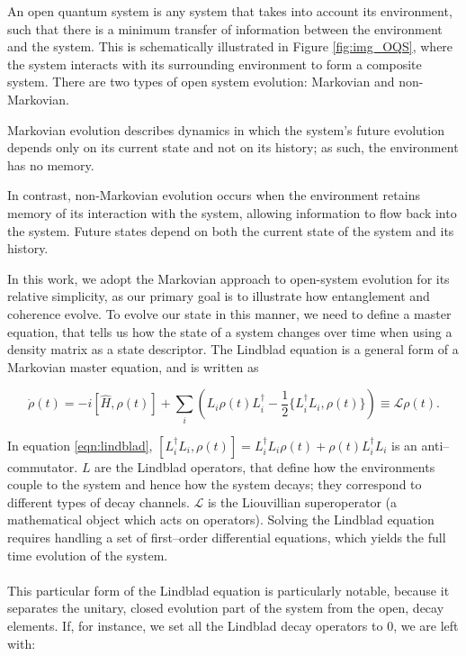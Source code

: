 \documentclass[11pt]{article}
\begin{document}
\noindent An open quantum system is any system that takes into account its environment, such that there is a minimum transfer of information between the environment and the system. This is schematically illustrated in Figure \ref{fig:img_OQS}, where the system interacts with its surrounding environment to form a composite system. There are two types of open system evolution: Markovian and non-Markovian.

Markovian evolution describes dynamics in which the system's future evolution depends only on its current state and not on its history; as such, the environment has no memory. 

In contrast, non-Markovian evolution occurs when the environment retains memory of its interaction with the system, allowing information to flow back into the system. Future states depend on both the current state of the system and its history. 

In this work, we adopt the Markovian approach to open-system evolution for its relative simplicity, as our primary goal is to illustrate how entanglement and coherence evolve. To evolve our state in this manner, we need to define a master equation, that tells us how the state of a system changes over time when using a density matrix as a state descriptor. The Lindblad equation is a general form of a Markovian master equation, and is written as 

\begin{equation} \label{eqn:lindblad}
    \dot \rho(t) = - i[\hat{H}, \rho(t)] + \sum_i\left(L_i\rho(t)L_i^\dagger - \frac{1}{2}\{L_i^\dagger L_i,\rho(t)\} \right) \equiv \mathcal{L}\rho(t).
\end{equation} 

In equation \ref{eqn:lindblad}, $[L_i^\dagger L_i, \rho (t)] = L_i^\dagger L_i\rho(t) + \rho(t)L_i^\dagger L_i$ is an anti--commutator. $L$ are the Lindblad operators, that define how the environments couple to the system and hence how the system decays; they correspond to different types of decay channels. $\mathcal{L}$ is the Liouvillian superoperator (a mathematical object which acts on operators). Solving the Lindblad equation requires handling a set of first--order differential equations, which yields the full time evolution of the system. \\
\\
This particular form of the Lindblad equation is particularly notable, because it separates the unitary, closed evolution part of the system from the open, decay elements. If, for instance, we set all the Lindblad decay operators to 0, we are left with:
\end{document}
